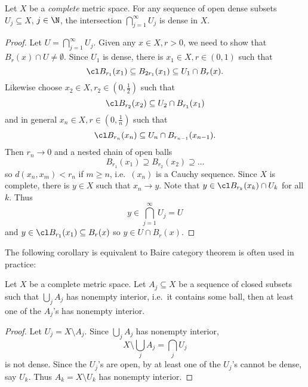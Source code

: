 \documentclass[a4paper]{article}
\begin{document}
\begin{theorem}
  \label{thm:BCT}
  Let \(X\) be a \emph{complete} metric space. For any sequence of open dense subsets \(U_j \subseteq X\), \(j \in \N\), the intersection \(\bigcap_{j = 1}^\infty U_j\) is dense in \(X\).
\end{theorem}

\begin{proof}
  Let \(U = \bigcap_{j = 1}^\infty U_j\). Given any \(x \in X, r > 0\), we need to show that \(B_r(x) \cap U \neq \emptyset\). Since \(U_1\) is dense, there is \(x_1 \in X, r \in (0, 1)\) such that
  \[
    \cl B_{r_1}(x_1) \subseteq B_{2r_1}(x_1) \subseteq U_1 \cap B_r(x).
  \]
  Likewise choose \(x_2 \in X, r_2 \in (0, \frac{1}{2})\) such that
  \[
    \cl B_{r_2}(x_2) \subseteq U_2 \cap B_{r_1}(x_1)
  \]
  and in general \(x_n \in X, r \in (0, \frac{1}{n})\) such that
  \[
    \cl B_{r_n}(x_n) \subseteq U_n \cap B_{r_{n - 1}}(x_{n - 1}).
  \]
  Then \(r_n \to 0\) and a nested chain of open balls
  \[
    B_{r_1}(x_1) \supseteq B_{r_2}(x_2) \supseteq \dots
  \]
  so \(d(x_n, x_m) < r_n\) if \(m \geq n\), i.e.\ \((x_n)\) is a Cauchy sequence. Since \(X\) is complete, there is \(y \in X\) such that \(x_n \to y\). Note that \(y \in \cl B_{r_k}(x_k) \cap U_k\) for all \(k\). Thus
  \[
    y \in \bigcap_{j = 1}^\infty U_j = U
  \]
  and \(y \in \cl B_{r_1}(x_1) \subseteq B_r(x)\) so \(y \in U \cap B_r(x)\).
\end{proof}

The following corollary is equivalent to Baire category theorem is often used in practice:

\begin{corollary}
  Let \(X\) be a complete metric space. Let \(A_j \subseteq X\) be a sequence of closed subsets such that \(\bigcup_j A_j\) has nonempty interior, i.e.\ it contains some ball, then at least one of the \(A_j\)'s has nonempty interior.
\end{corollary}

\begin{proof}
  Let \(U_j = X \setminus A_j\). Since \(\bigcup_j A_j\) has nonempty interior,
  \[
    X \setminus \bigcup_j A_j = \bigcap_j U_j
  \]
  is not dense. Since the \(U_j\)'s are open, by  at least one of the \(U_j\)'s cannot be dense, say \(U_k\). Thus \(A_k = X \setminus U_k\) has nonempty interior.
\end{proof}
\end{document}
